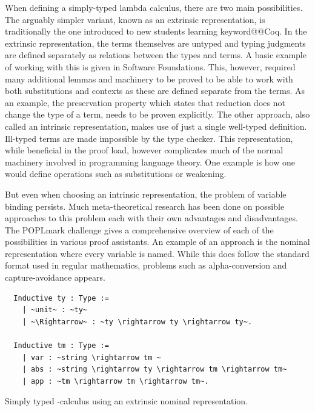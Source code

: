 \documentclass[11pt, final]{article}
\makeatletter
\def\<#1>{\csname keyword@@#1\endcsname}
\makeatother
\begin{document}
When defining a simply-typed lambda calculus, there are two main possibilities\cite{plfa2019}.
The arguably simpler variant, known as an extrinsic representation, is traditionally the one introduced to new students learning \<Coq>.
In the extrinsic representation, the terms themselves are untyped and typing judgments are defined separately as relations between the types and terms. A basic example of working with this is given in Software Foundations\cite{Pierce:SF2}.
This, however, required many additional lemmas and machinery to be proved to be able to work with both substitutions and contexts as these are defined separate from the terms.
As an example, the preservation property which states that reduction does not change the type of a term, needs to be proven explicitly.
The other approach, also called an intrinsic representation, makes use of just a single well-typed definition.
Ill-typed terms are made impossible by the type checker.
This representation, while beneficial in the proof load, however complicates much of the normal machinery involved in programming language theory.
One example is how one would define operations such as substitutions or weakening.

But even when choosing an intrinsic representation, the problem of variable binding persists.
Much meta-theoretical research has been done on possible approaches to this problem each with their own advantages and disadvantages.
The POPLmark challenge gives a comprehensive overview of each of the possibilities in various proof assistants\cite{Aydemir2005}.
An example of an approach is the nominal representation where every variable is named.
While this does follow the standard format used in regular mathematics, problems such as alpha-conversion and capture-avoidance appears.

\begin{listing}[h]
  \begin{verbatim}
  Inductive ty : Type :=
    | ~unit~ : ~ty~
    | ~\Rightarrow~ : ~ty \rightarrow ty \rightarrow ty~.

  Inductive tm : Type :=
    | var : ~string \rightarrow tm ~
    | abs : ~string \rightarrow ty \rightarrow tm \rightarrow tm~
    | app : ~tm \rightarrow tm \rightarrow tm~.
  \end{verbatim}
  \caption{Simply typed \lambda-calculus using an extrinsic nominal representation.}
  \label{lst:nominal_stlc}
\end{listing}
\end{document}
